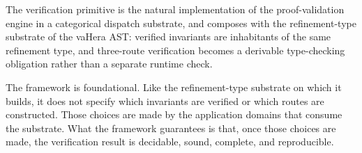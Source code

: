 \documentclass[twocolumn,11pt,a4paper]{article}
\begin{document}
The verification primitive is the natural implementation of the proof-validation engine in a categorical dispatch substrate, and composes with the refinement-type substrate of the vaHera AST: verified invariants are inhabitants of the same refinement type, and three-route verification becomes a derivable type-checking obligation rather than a separate runtime check.

The framework is foundational. Like the refinement-type substrate on which it builds, it does not specify which invariants are verified or which routes are constructed. Those choices are made by the application domains that consume the substrate. What the framework guarantees is that, once those choices are made, the verification result is decidable, sound, complete, and reproducible.



\end{document}
